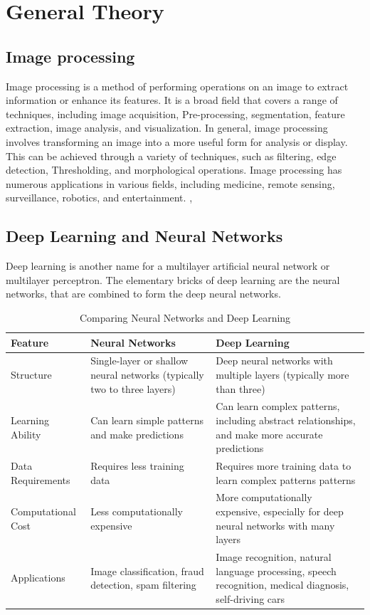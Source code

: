 \section{General Theory}
\subsection{Image processing}
Image processing is a method of performing operations on an image to extract information or enhance its features. It is a broad field that covers a range of techniques, including image acquisition, Pre-processing, segmentation, feature extraction, image analysis, and visualization. In general, image processing involves transforming an image into a more useful form for analysis or display. This can be achieved through a variety of techniques, such as filtering, edge detection, Thresholding, and morphological operations. Image processing has numerous applications in various fields, including medicine, remote sensing, surveillance, robotics, and entertainment. \cite{wilhelm2016digital}, \cite{tyagi2018understanding} 

\subsection{Deep Learning and Neural Networks}
Deep learning is another name for a multilayer artificial neural network or multilayer perceptron. The elementary
bricks of deep learning are the neural networks, that are combined to form the deep neural networks.

\begin{table}[htbp]
\centering
\caption{Comparing Neural Networks and Deep Learning}
\footnotesize
\begin{tabular}{ |p{3cm}|p{5cm}|p{5cm}| }%
\hline
Feature & Neural Networks & Deep Learning \\
\hline
Structure & Single-layer or shallow neural networks (typically two to three layers) & Deep neural networks with multiple layers (typically more than three) \\
\hline
Learning Ability & Can learn simple patterns and make predictions & Can learn complex patterns, including abstract relationships, and make more accurate predictions \\
\hline
Data Requirements & Requires less training data & Requires more training data to learn complex patterns patterns \\
\hline
Computational Cost & Less computationally expensive & More computationally expensive, especially for deep neural networks with many layers \\
\hline
Applications & Image classification, fraud detection, spam filtering & Image recognition, natural language processing, speech recognition, medical diagnosis, self-driving cars \\
\hline
\end{tabular}
\end{table}

